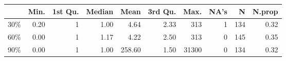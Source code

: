 \begin{table}[ht]
\centering
\begin{tabular}{lrrrrrrrrr}
  \hline
 & Min. & 1st Qu. & Median & Mean & 3rd Qu. & Max. & NA's & N & N.prop \\ 
  \hline
30\% & 0.20 &   1 & 1.00 & 4.64 & 2.33 & 313 &   1 & 134 & 0.32 \\ 
  60\% & 0.00 &   1 & 1.17 & 4.22 & 2.50 & 313 &   0 & 145 & 0.35 \\ 
  90\% & 0.00 &   1 & 1.00 & 258.60 & 1.50 & 31300 &   0 & 134 & 0.32 \\ 
   \hline
\end{tabular}
\end{table}
